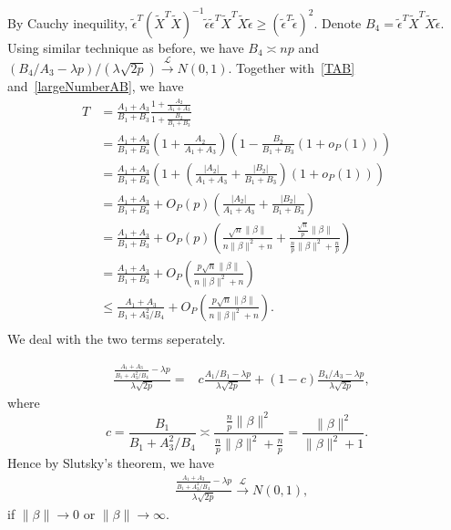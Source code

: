 \documentclass[review]{elsarticle}
\theoremstyle{plain}
\theoremstyle{definition}
\theoremstyle{remark}
\begin{document}
By Cauchy inequility,
    $\tilde{\epsilon}^T {(\tilde{X}^T\tilde{X})}^{-1} \tilde{\epsilon}
    \tilde{\epsilon}^T \tilde{X}^T\tilde{X} \tilde{\epsilon}\geq {(\tilde{\epsilon}^T \tilde{\epsilon})}^2$.
    Denote $B_4=\tilde{\epsilon}^T \tilde{X}^T\tilde{X} \tilde{\epsilon}$. Using similar technique as before, we have $B_4\asymp np $ and $(B_4/A_3-\lambda p)/(\lambda \sqrt{2p})\xrightarrow{\mathcal{L}}N(0,1)$.
    Together with~\eqref{TAB} and~\eqref{largeNumberAB}, we have
    \begin{equation}\label{ChangT}
        \begin{aligned}
            T&=\frac{A_1+A_3}{B_1+B_3}\frac{1+\frac{A_2}{A_1+A_3}}{1+\frac{B_2}{B_1+B_3}}\\
            &=\frac{A_1+A_3}{B_1+B_3}{(1+\frac{A_2}{A_1+A_3})}{(1-\frac{B_2}{B_1+B_3}(1+o_P(1)))}\\
            &=\frac{A_1+A_3}{B_1+B_3}{(1+(\frac{|A_2|}{A_1+A_3}+\frac{|B_2|}{B_1+B_3})(1+o_P(1)))}\\
            &=\frac{A_1+A_3}{B_1+B_3}+O_P(p)(\frac{|A_2|}{A_1+A_3}+\frac{|B_2|}{B_1+B_3})\\
            &=\frac{A_1+A_3}{B_1+B_3}+O_P(p)(\frac{\sqrt{n}\|\beta\|}{n\|\beta\|^2+n}+\frac{\frac{\sqrt{n}}{p}\|\beta\|}{\frac{n}{p}\|\beta\|^2+\frac{n}{p}})\\
            &=\frac{A_1+A_3}{B_1+B_3}+O_P(\frac{p\sqrt{n}\|\beta\|}{n\|\beta\|^2+n})\\
            &\leq\frac{A_1+A_3}{B_1+A_3^2/B_4}+O_P(\frac{p\sqrt{n}\|\beta\|}{n\|\beta\|^2+n}).\\
        \end{aligned}
    \end{equation}
We deal with the two terms seperately.


\begin{equation*}
    \begin{aligned}
        &\frac{\frac{A_1+A_3}{B_1+A_3^2/B_4}-{\lambda p}}{\lambda\sqrt{2p}}=&c\frac{{A_1}/{B_1}-\lambda p}{\lambda \sqrt{2p}}
        +(1-c)\frac{{B_4}/{A_3}-\lambda p}{\lambda \sqrt{2p}},
    \end{aligned}
\end{equation*}
where 
\begin{equation*}
    c=\frac{B_1}{B_1+A_3^2/B_4}\asymp \frac{\frac{n}{p}\|\beta\|^2}{\frac{n}{p}\|\beta\|^2+\frac{n}{p}}
    =\frac{\|\beta\|^2}{\|\beta\|^2+1}.
\end{equation*}
Hence by Slutsky's theorem, we have
\begin{equation*}
    \begin{aligned}
        &\frac{\frac{A_1+A_3}{B_1+A_3^2/B_4}-{\lambda p}}{\lambda\sqrt{2p}}\xrightarrow{\mathcal{L}} N(0,1),
    \end{aligned}
\end{equation*}
if $\|\beta\|\to 0$ or $\|\beta\|\to \infty$.
\end{document}
